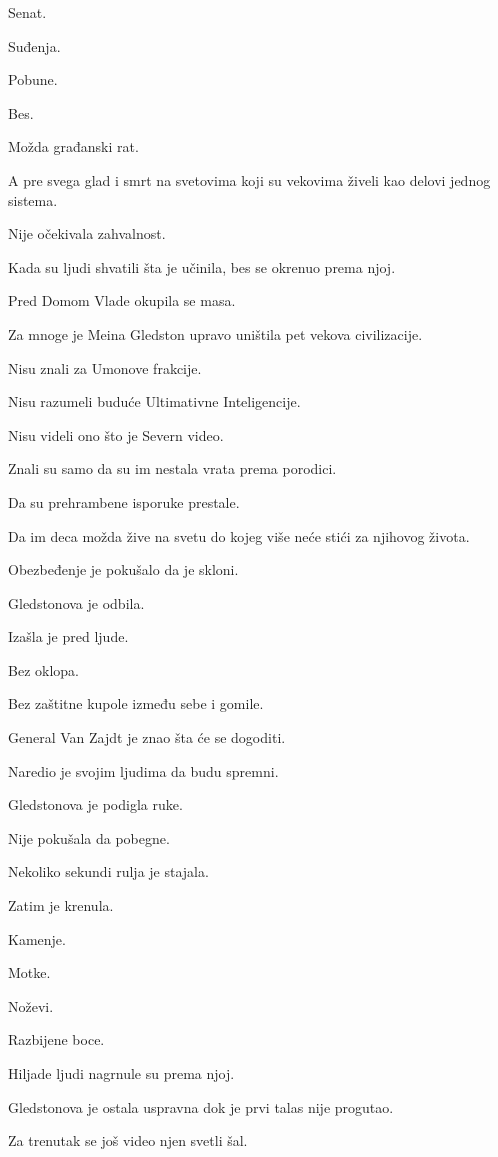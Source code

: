 Senat.

Suđenja.

Pobune.

Bes.

Možda građanski rat.

A pre svega glad i smrt na svetovima koji su vekovima živeli kao delovi jednog sistema.

Nije očekivala zahvalnost.

\bigskip

Kada su ljudi shvatili šta je učinila, bes se okrenuo prema njoj.

Pred Domom Vlade okupila se masa.

Za mnoge je Meina Gledston upravo uništila pet vekova civilizacije.

Nisu znali za Umonove frakcije.

Nisu razumeli buduće Ultimativne Inteligencije.

Nisu videli ono što je Severn video.

Znali su samo da su im nestala vrata prema porodici.

Da su prehrambene isporuke prestale.

Da im deca možda žive na svetu do kojeg više neće stići za njihovog života.

\bigskip

Obezbeđenje je pokušalo da je skloni.

Gledstonova je odbila.

Izašla je pred ljude.

Bez oklopa.

Bez zaštitne kupole između sebe i gomile.

General Van Zajdt je znao šta će se dogoditi.

Naredio je svojim ljudima da budu spremni.

Gledstonova je podigla ruke.

Nije pokušala da pobegne.

\bigskip

Nekoliko sekundi rulja je stajala.

Zatim je krenula.

Kamenje.

Motke.

Noževi.

Razbijene boce.

Hiljade ljudi nagrnule su prema njoj.

Gledstonova je ostala uspravna dok je prvi talas nije progutao.

Za trenutak se još video njen svetli šal.


